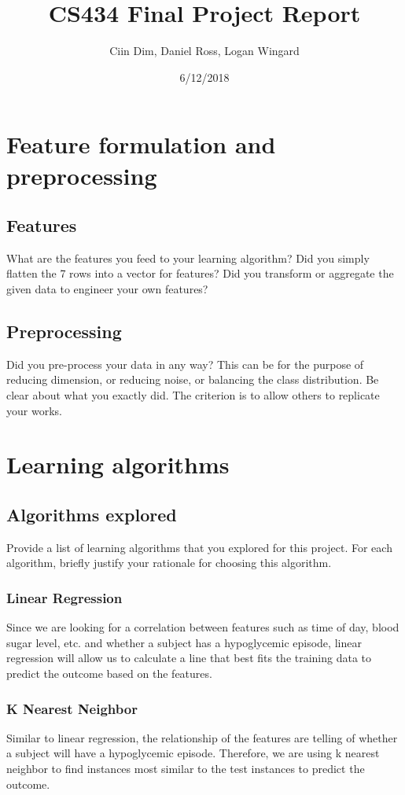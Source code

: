 \documentclass[11pt,a4paper]{article}
\title{CS434 Final Project Report}
\author{Ciin Dim, Daniel Ross, Logan Wingard}
\date{6/12/2018}
\begin{document}
\maketitle
\section{Feature formulation and preprocessing}
\subsection{Features} What are the features you feed to your learning algorithm? Did you simply flatten the 7 rows into a vector for features? Did you transform or aggregate the given data to engineer your own features?

\subsection{Preprocessing}
Did you pre-process your data in any way? This can be for the purpose of reducing dimension, or reducing noise, or balancing the class distribution. Be clear about what you exactly did. The criterion is to allow others to replicate your works.

\section{Learning algorithms}
\subsection{Algorithms explored}
Provide a list of learning algorithms that you explored for this project. For each algorithm, briefly justify your rationale for choosing this algorithm.
\subsubsection{Linear Regression}
Since we are looking for a correlation between features such as time of day, blood sugar level, etc. and whether a subject has a hypoglycemic episode, linear regression will allow us to calculate a line that best fits the training data to predict the outcome based on the features.
\subsubsection{K Nearest Neighbor}
Similar to linear regression, the relationship of the features are telling of whether a subject will have a hypoglycemic episode. Therefore, we are using k nearest neighbor to find instances most similar to the test instances to predict the outcome.
\end{document}
